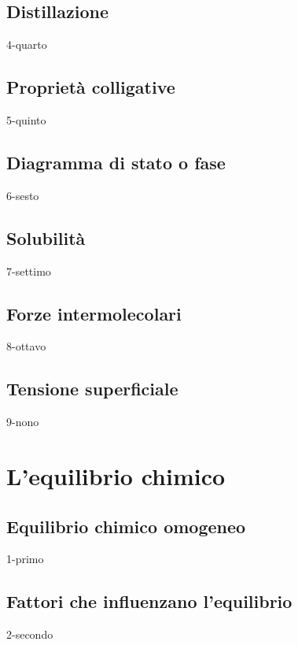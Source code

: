 \documentclass[12pt]{book}%
\begin{document}
  \vspace{-0.3cm}\section{Distillazione}
  {4-quarto}

  \section{Proprietà colligative}
    {5-quinto}

    \newpage

  \section{Diagramma di stato o fase}
    {6-sesto}

    \newpage

  \section{Solubilità}
    {7-settimo}

    \newpage

  \section{Forze intermolecolari}
    {8-ottavo}

  \section{Tensione superficiale}
    {9-nono}

\chapter{L'equilibrio chimico}

  \section{Equilibrio chimico omogeneo}
    {1-primo}

  \section{Fattori che influenzano l'equilibrio}
    {2-secondo}
\end{document}
